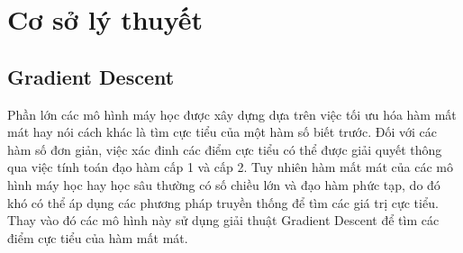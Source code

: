 \chapter{Cơ sở lý thuyết}

\section{Gradient Descent}
Phần lớn các mô hình máy học được xây dựng dựa trên việc tối ưu hóa hàm mất mát hay nói cách khác là tìm cực tiểu của một hàm số biết trước. Đối với các hàm số đơn giản, việc xác đinh các điểm cực tiểu có thể được giải quyết thông qua việc tính toán đạo hàm cấp 1 và cấp 2. Tuy nhiên hàm mất mát của các mô hình máy học hay học sâu thường có số chiều lớn và đạo hàm phức tạp, do đó khó có thể áp dụng các phương pháp truyền thống để tìm các giá trị cực tiểu. Thay vào đó các mô hình này sử dụng giải thuật Gradient Descent để tìm các điểm cực tiểu của hàm mất mát.

